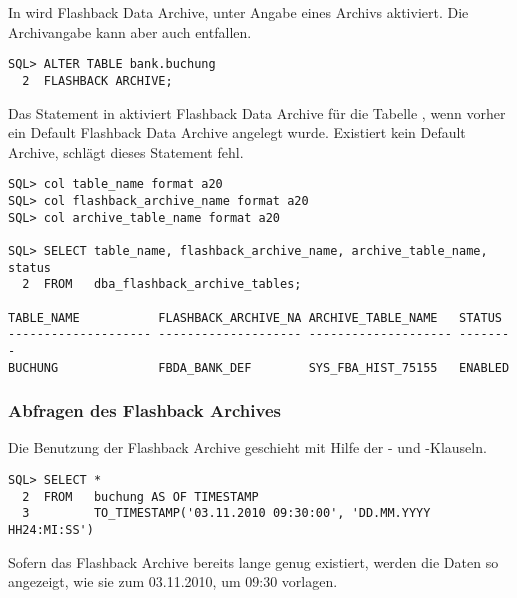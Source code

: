           In  wird Flashback Data Archive, unter Angabe eines Archivs aktiviert. Die Archivangabe kann aber auch entfallen.
          \begin{lstlisting}[caption={Flashback Data Archive mit einem Default Archive aktivieren},label=admin1731,language=oracle_sql]
SQL> ALTER TABLE bank.buchung
  2  FLASHBACK ARCHIVE;
          \end{lstlisting}
          Das Statement in  aktiviert Flashback Data Archive f\"ur die Tabelle , wenn vorher ein Default Flashback Data Archive angelegt wurde. Existiert kein Default Archive, schl\"agt dieses Statement fehl.
          \begin{lstlisting}[caption={Welche Archive wurden benutzt?},label=admin1732,language=oracle_sql,alsolanguage=sqlplus]
SQL> col table_name format a20
SQL> col flashback_archive_name format a20
SQL> col archive_table_name format a20

SQL> SELECT table_name, flashback_archive_name, archive_table_name, status
  2  FROM   dba_flashback_archive_tables;

TABLE_NAME           FLASHBACK_ARCHIVE_NA ARCHIVE_TABLE_NAME   STATUS
-------------------- -------------------- -------------------- --------
BUCHUNG              FBDA_BANK_DEF        SYS_FBA_HIST_75155   ENABLED
          \end{lstlisting}
\clearpage
        \subsubsection{Abfragen des Flashback Archives}
          Die Benutzung der Flashback Archive geschieht mit Hilfe der - und -Klauseln.
          \begin{lstlisting}[caption={Flashback Data Archive mit einem Default Archive aktivieren},label=admin1733,language=oracle_sql]
SQL> SELECT *
  2  FROM   buchung AS OF TIMESTAMP
  3         TO_TIMESTAMP('03.11.2010 09:30:00', 'DD.MM.YYYY HH24:MI:SS')
          \end{lstlisting}
          Sofern das Flashback Archive bereits lange genug existiert, werden die Daten so angezeigt, wie sie zum 03.11.2010, um 09:30 vorlagen.
